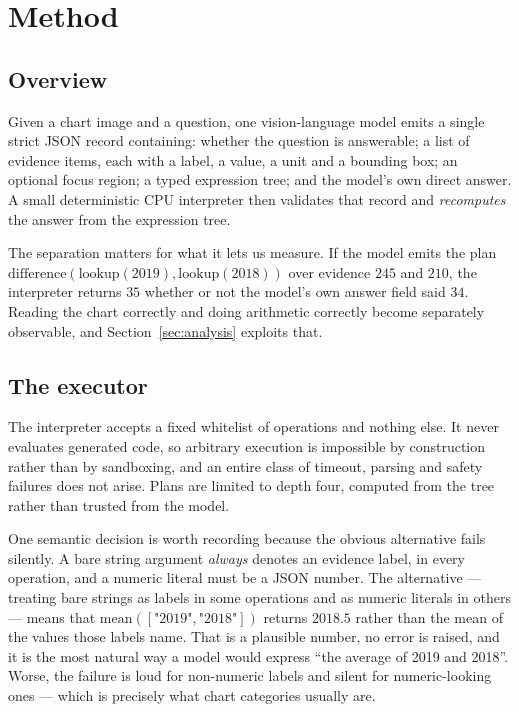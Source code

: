 \section{Method}
\label{sec:method}

\subsection{Overview}

Given a chart image and a question, one vision-language model emits a single strict JSON record
containing: whether the question is answerable; a list of evidence items, each with a label, a
value, a unit and a bounding box; an optional focus region; a typed expression tree; and the model's
own direct answer. A small deterministic CPU interpreter then validates that record and
\emph{recomputes} the answer from the expression tree.



The separation matters for what it lets us measure. If the model emits the plan
$\mathrm{difference}(\mathrm{lookup}(\text{2019}), \mathrm{lookup}(\text{2018}))$ over evidence
$245$ and $210$, the interpreter returns $35$ whether or not the model's own answer field said
$34$. Reading the chart correctly and doing arithmetic correctly become separately observable, and
Section~\ref{sec:analysis} exploits that.

\subsection{The executor}
\label{sec:method:executor}

The interpreter accepts a fixed whitelist of operations and nothing else. It never evaluates
generated code, so arbitrary execution is impossible by construction rather than by sandboxing, and
an entire class of timeout, parsing and safety failures does not arise. Plans are limited to depth
four, computed from the tree rather than trusted from the model.

One semantic decision is worth recording because the obvious alternative fails silently. A bare
string argument \emph{always} denotes an evidence label, in every operation, and a numeric literal
must be a JSON number. The alternative --- treating bare strings as labels in some operations and as
numeric literals in others --- means that
$\mathrm{mean}([\text{"2019"}, \text{"2018"}])$ returns $2018.5$ rather than the mean of the values
those labels name. That is a plausible number, no error is raised, and it is the most natural way a
model would express ``the average of 2019 and 2018''. Worse, the failure is loud for non-numeric
labels and silent for numeric-looking ones --- which is precisely what chart categories usually are.

